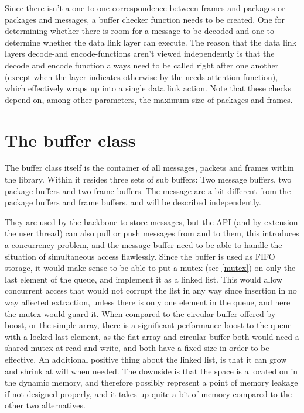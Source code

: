 Since there isn't a one-to-one correspondence between frames and packages or packages and messages, a buffer checker function needs to be created. One for determining whether there is room for a message to be decoded and one to determine whether the data link layer can execute. The reason that the data link layers decode-and encode-functions aren't viewed independently is that the decode and encode function always need to be called right after one another (except when the layer indicates otherwise by the needs attention function), which effectively wraps up into a single data link action.
Note that these checks depend on, among other parameters, the maximum size of packages and frames.





\section{The buffer class}
The buffer class itself is the container of all messages, packets and frames within the library. Within it resides three sets of sub buffers: Two message buffers, two package buffers and two frame buffers. 
The message are a bit different from the package buffers and frame buffers, and will be described independently. 

They are used by the backbone to store messages, but the API (and by extension the user thread) can also pull or push messages from and to them, this introduces a concurrency problem, and the message buffer need to be able to handle the situation of simultaneous access flawlessly.
Since the buffer is used as FIFO storage, it would make sense to be able to put a mutex (see \ref{mutex}) on only the last element of the queue, and implement it as a linked list.
This would allow concurrent access that would not corrupt the list in any way since insertion in no way affected extraction, unless there is only one element in the queue, and here the mutex would guard it.
When compared to the circular buffer offered by boost, or the simple array, there is a significant performance boost to the queue with a locked last element, as the flat array and circular buffer both would need a shared mutex at read and write, and both have a fixed size in order to be effective.
An additional positive thing about the linked list, is that it can grow and shrink at will when needed. The downside is that the space is allocated on in the dynamic memory, and therefore possibly represent a point of memory leakage if not designed properly, and it takes up quite a bit of memory compared to the other two alternatives.

